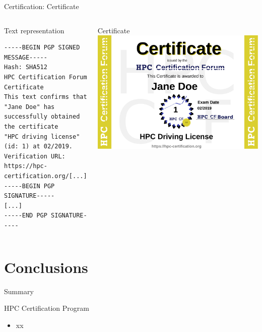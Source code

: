 \documentclass[compress,aspectratio=169]{beamer}
\begin{document}
\begin{frame}[fragile]{Certification: Certificate}
\begin{columns}
	\begin{block}{Text representation}

		\scriptsize
		\begin{verbatim}
-----BEGIN PGP SIGNED MESSAGE-----
Hash: SHA512
HPC Certification Forum Certificate
This text confirms that "Jane Doe" has
successfully obtained the certificate
"HPC driving license" (id: 1) at 02/2019.
Verification URL: https://hpc-certification.org/[...]
-----BEGIN PGP SIGNATURE-----
[...]
-----END PGP SIGNATURE-----
		\end{verbatim}
	\end{block}

	\begin{block}{Certificate}
		\medskip
		\includegraphics[width=\textwidth]{jane-doe}
	\end{block}
\end{columns}
\end{frame}



\section{Conclusions}
\sectionIntroHidden


\begin{frame}{Summary}

	\begin{block}{HPC Certification Program}
		\begin{itemize}
			\item xx
		\end{itemize}
	\end{block}
\end{frame}
\end{document}

